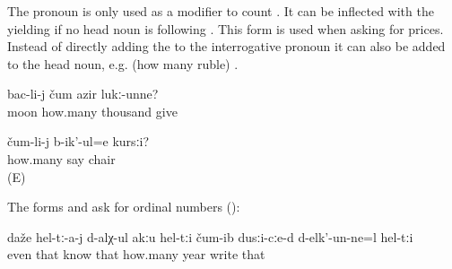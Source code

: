 \subsubsection{ }
\label{sssec:cum how many}

The pronoun   is only used as a modifier to count . It can be inflected with the  yielding  if no head noun is following . This form is used when asking for prices. Instead of directly adding the  to the interrogative pronoun it can also be added to the head noun, e.g.  (how many ruble) .
%
\begin{exe}
	\ex	\label{ex:How many thousand (of rubles) does (the government) give per month (as child allowance)?}
	\gll	bac-li-j	čum	azir	lukː-unne?\\
		moon	how.many	thousand	give\\
	\glt	{}

	\ex	\label{ex:How much does the chair cost?}
	\gll	čum-li-j	b-ik'-ul=e	kursːi?\\
		how.many	say	chair\\
	\glt	{} (E)
\end{exe}

The forms  and  ask for ordinal numbers ():
%
\begin{exe}
	\ex	\label{ex:Even they do not remember in which year (the pictures) were drawn}
	\gll	daže	hel-tː-a-j d-alχ-ul akːu	hel-tːi	čum-ib	dusːi-cːe-d d-elk'-un-ne=l	hel-tːi\\
		even	that	know		that		how.many	year	write	that\\
	\glt	{}
\end{exe}




